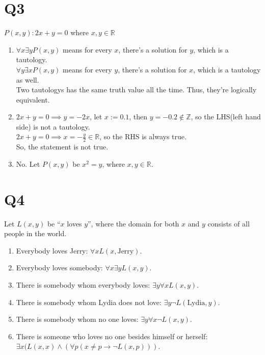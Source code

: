 \documentclass[11pt]{article}
\newenvironment{qparts}{\begin{enumerate}[{(}a{)}]}{\end{enumerate}}
\begin{document}
\section*{Q3}
$P(x,y): 2x+y=0$ where $x,y \in \mathbb{R}$
\begin{qparts}
    \item $\forall x \exists yP(x,y)$ means for every $x$, 
    there's a solution for $y$, which is a tautology. \\
    $\forall y \exists xP(x,y)$ means for every $y$, 
    there's a solution for $x$, which is a tautology as well.\\
    Two tautologys has the same truth value all the time. Thus,
    they're logically equivalent.
    
    \item 
    $2x+y=0 \implies y=-2x$, let $x:=0.1$, then $y=-0.2 \notin \mathbb{Z}$, 
    so the LHS(left hand side) is not a tautology.\\
    $2x+y=0 \implies x=-\frac{y}{2}\in \mathbb{R}$, so the RHS is always true.
    \\
    So, the statement is not true.

    
    \item No. Let $P(x,y)$ be $x^{2}=y$, where $x,y \in \mathbb{R}$.
\end{qparts}


\section*{Q4}
Let $L(x,y)$ be ``$x$ loves $y$'', where the domain for
both $x$ and $y$ consists of all people in the world.

\begin{qparts}
    \item Everybody loves Jerry: 
    $\forall x L(x,\text{Jerry})$.

    \item Everybody loves somebody: 
    $\forall x \exists yL(x,y)$.

    \item There is somebody whom everybody loves: 
    $\exists y \forall x L(x,y)$.
    
    \item There is somebody whom Lydia does not love:
    $\exists y \lnot L(\text{Lydia},y)$.
    
    \item There is somebody whom no one loves:
    $\exists y \forall x \lnot L(x,y)$.
    
    \item There is someone who loves no one besides himself or herself:
    $\exists x (L(x,x)\land (\forall p (x\neq p\to \lnot L(x,p)))$.
\end{qparts}
\end{document}

